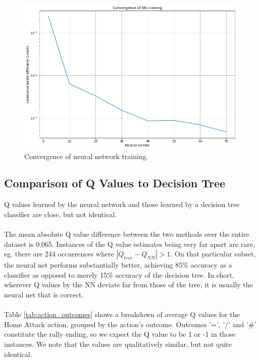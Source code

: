 \documentclass[12pt,letter]{article}
\begin{document}
	\begin{figure}
		\centering
		\includegraphics[scale=0.5]{images/nn_convergence.png}
		\caption{Convergence of neural network training.}
		\label{fig:nn_convergence}
	\end{figure}
	
	\subsection*{Comparison of Q Values to Decision Tree}
	
	Q values learned by the neural network and those learned by a decision tree classifier are close, but not identical.\\\\
	The mean absolute Q value difference between the two methods over the entire dataset is 0.065. Instances of the Q value estimates being very far apart are rare, eg. there are 244 occurrences where $|Q_{tree}-Q_{NN}| > 1$. On that particular subset, the neural net performs substantially better, achieving 85\% accuracy as a classifier as opposed to merely 15\% accuracy of the decision tree. In short, wherever Q values by the NN deviate far from those of the tree, it is usually the neural net that is correct.\\\\
	Table \ref{tab:action_outcomes} shows a breakdown of average Q values for the Home Attack action, grouped by the action's outcome. Outcomes '=', '/' and '\#' constitute the rally ending, so we expect the Q value to be 1 or -1 in those instances. We note that the values are qualitatively similar, but not quite identical.
	
\end{document}
